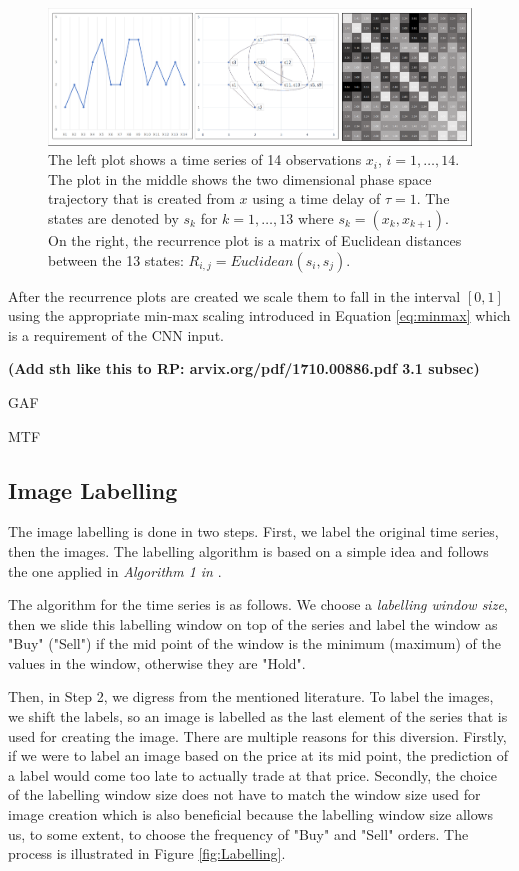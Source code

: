 \documentclass[11pt, a4paper]{article}
\begin{document}
\begin{figure}[ht]
    \centering
    \includegraphics[width=\textwidth]{images/RP.png}
    \caption{The left plot shows a time series of 14 observations $x_i$, $i=1,\dots,14$. The plot in the middle shows the two dimensional phase space trajectory that is created from $x$ using a time delay of $\tau = 1$. The states are denoted by $s_k$ for $k=1,\dots,13$ where $s_k = (x_k, x_{k+1})$. On the right, the recurrence plot is a matrix of Euclidean distances between the 13 states: $R_{i,j} = Euclidean(s_i,s_j)$.}
    \label{fig:RP_Def}
\end{figure}

After the recurrence plots are created we scale them to fall in the interval $[0, 1]$ using the appropriate min-max scaling introduced in Equation \ref{eq:minmax} which is a requirement of the CNN input. 

\textbf{(Add sth like this to RP: arvix.org/pdf/1710.00886.pdf 3.1 subsec)}

GAF

MTF

\subsection{Image Labelling}
\label{subsec:DM:IL}
The image labelling is done in two steps. First, we label the original time series, then the images.
The labelling algorithm is based on a simple idea and follows the one applied in \textit{Algorithm 1 in} \cite{sezer2018algorithmic}.

The algorithm for the time series is as follows. We choose a \textit{labelling window size}, then we slide this labelling window on top of the series and label the window as "Buy" ("Sell") if the mid point of the window is the minimum (maximum) of the values in the window, otherwise they are "Hold". 

Then, in Step 2, we digress from the mentioned literature. To label the images, we shift the labels, so an image is labelled as the last element of the series that is used for creating the image. There are multiple reasons for this diversion. Firstly, if we were to label an image based on the price at its mid point, the prediction of a label would come too late to actually trade at that price. Secondly, the choice of the labelling window size does not have to match the window size used for image creation which is also beneficial because the labelling window size allows us, to some extent, to choose the frequency of "Buy" and "Sell" orders. The process is illustrated in Figure \ref{fig:Labelling}.
\end{document}

